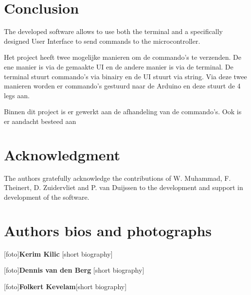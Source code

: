 \documentclass[conference]{IEEEtran}
\begin{document}
\section{Conclusion}
The developed software allows to use both the terminal and a specifically designed User Interface to send commands to the microcontroller.

Het project heeft twee mogelijke manieren om de commando's te verzenden. De ene manier is via de gemaakte UI en de andere manier is via de terminal. De terminal stuurt commando's via binairy en de UI stuurt via string. Via deze twee manieren worden er commando's gestuurd naar de Arduino en deze stuurt de 4 legs aan. 

Binnen dit project is er gewerkt aan de afhandeling van de commando's. Ook is er aandacht besteed aan 




\section*{Acknowledgment}
The authors gratefully acknowledge the contributions of W. Muhammad, F. Theinert, D. Zuidervliet and P. van Duijssen to the development and support in development of the software.







\section{Authors bios and photographs}

[foto]\textbf{Kerim Kilic} [short biography]

[foto]\textbf{Dennis van den Berg} [short biography]

[foto]\textbf{Folkert Kevelam}[short biography]
\end{document}
